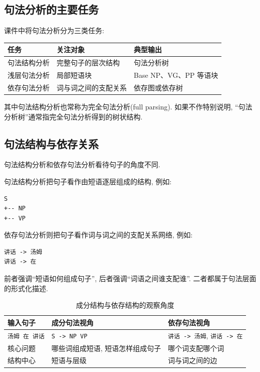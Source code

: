 \subsection{句法分析的主要任务}


课件中将句法分析分为三类任务:

\begin{table}[H]
\centering
\begingroup
\setlength{\tabcolsep}{2pt}
\small
\begin{tabular}{|p{}|p{}|p{}|}
\hline
任务 & 关注对象 & 典型输出 \\ \hline
句法结构分析 & 完整句子的层次结构 & 句法分析树 \\ \hline
浅层句法分析 & 局部短语块 & Base NP、VG、PP 等语块 \\ \hline
依存句法分析 & 词与词之间的支配关系 & 依存图或依存树 \\ \hline
\end{tabular}
\endgroup
\end{table}

其中句法结构分析也常称为完全句法分析(full parsing).
如果不作特别说明, “句法分析树”通常指完全句法分析得到的树状结构.

\subsection{句法结构与依存关系}


句法结构分析和依存句法分析看待句子的角度不同.

句法结构分析把句子看作由短语逐层组成的结构, 例如:

\begin{Verbatim}[breaklines=true,breakanywhere=true,fontsize=\small]
S
+-- NP
+-- VP
\end{Verbatim}

依存句法分析则把句子看作词与词之间的支配关系网络, 例如:

\begin{Verbatim}[breaklines=true,breakanywhere=true,fontsize=\small]
讲话 -> 汤姆
讲话 -> 在
\end{Verbatim}

前者强调“短语如何组成句子”, 后者强调“词语之间谁支配谁”.
二者都属于句法层面的形式化描述.

\begin{table}[H]
\centering
\begingroup
\setlength{\tabcolsep}{2pt}
\small
\caption{成分结构与依存结构的观察角度}
\begin{tabular}{|p{}|p{}|p{}|}
\hline
输入句子 & 成分句法视角 & 依存句法视角 \\ \hline
\texttt{汤姆 在 讲话} & \texttt{S -\textgreater{} NP VP} & \texttt{讲话 -\textgreater{} 汤姆}, \texttt{讲话 -\textgreater{} 在} \\ \hline
核心问题 & 哪些词组成短语, 短语怎样组成句子 & 哪个词支配哪个词 \\ \hline
结构中心 & 短语与层级 & 词与词之间的边 \\ \hline
\end{tabular}
\endgroup
\end{table}

